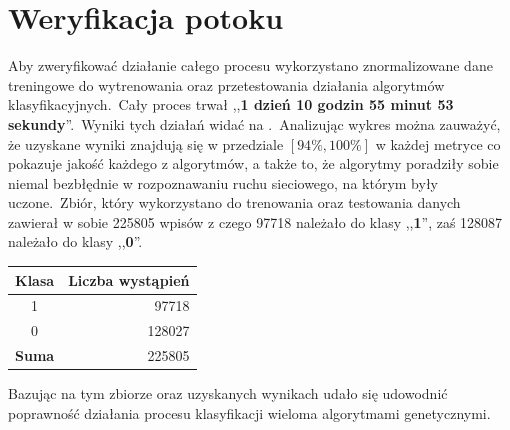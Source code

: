 \section{Weryfikacja potoku}
Aby zweryfikować działanie całego procesu wykorzystano znormalizowane dane treningowe do wytrenowania oraz przetestowania działania algorytmów klasyfikacyjnych.\ Cały proces trwał ,,\textbf{1 dzień 10 godzin 55 minut 53 sekundy}''.\ Wyniki tych działań widać na .\ Analizując wykres można zauważyć, że uzyskane wyniki znajdują się w przedziale $[94\%, 100\%]$ w każdej metryce co pokazuje jakość każdego z algorytmów, a także to, że algorytmy poradziły sobie niemal bezbłędnie w rozpoznawaniu ruchu sieciowego, na którym były uczone.\ Zbiór, który wykorzystano do trenowania oraz testowania danych zawierał w sobie 225805 wpisów z czego 97718 należało do klasy ,,\textbf{1}'', zaś 128087 należało do klasy ,,\textbf{0}''.

\begin{table}[H]
    \centering
    \label{tab:trening-data-label}
    \begin{tabular}{|c|r|}
        \hline
        \textbf{Klasa} & \textbf{Liczba wystąpień} \\ \hline
        1              & 97718                     \\ \hline
        0              & 128027                    \\ \hline
        \textbf{Suma}  & 225805                    \\ \hline
    \end{tabular}
\end{table}

Bazując na tym zbiorze oraz uzyskanych wynikach udało się udowodnić poprawność działania procesu klasyfikacji wieloma algorytmami genetycznymi.

